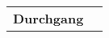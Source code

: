 \documentclass{article}
\begin{document}
    \begin{table}[h]
       \centering
       \begin{tabular}{c|c}
            \textbf{Durchgang} 
       \end{tabular} 
    \end{table}
\end{document}
